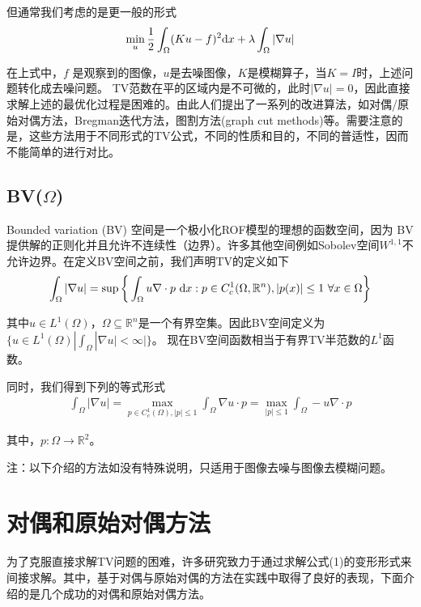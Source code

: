 \documentclass[a4paper,12pt]{article}
\begin{document}
但通常我们考虑的是更一般的形式
\begin{eqnarray}
\min_u \frac{1}{2}\int_{\Omega}(Ku-f)^2\mathrm{d} x+\lambda\int_{\Omega}|\nabla u| 
\end{eqnarray}

在上式中，$f$ 是观察到的图像，$u$是去噪图像，$K$是模糊算子，当$K=I$时，上述问题转化成去噪问题。
TV范数在平的区域内是不可微的，此时$|\nabla u|=0$，因此直接求解上述的最优化过程是困难的。由此人们提出了一系列的改进算法，如对偶/原始对偶方法，Bregman迭代方法，图割方法(graph cut methods)等。需要注意的是，这些方法用于不同形式的TV公式，不同的性质和目的，不同的普适性，因而不能简单的进行对比。

\subsection{BV($\Omega$)}

Bounded variation (BV) 空间是一个极小化ROF模型的理想的函数空间，因为
BV提供解的正则化并且允许不连续性（边界）。许多其他空间例如Sobolev空间$W^{1,1}$不允许边界。在定义BV空间之前，我们声明TV的定义如下
\begin{eqnarray*}
\int_{\Omega}|\nabla u|=\sup\bigg{\{}\int_{\Omega}u\nabla\cdot p\ \mathrm{d} x:p\in C_c^1(\Omega, \mathbb{R}^n),|p(x)|\leq 1\ \forall x\in \Omega\bigg{\}}
\end{eqnarray*}

其中$u\in L^1(\Omega)$，$\Omega\subseteq\mathbb{R}^n$是一个有界空集。因此BV空间定义为$\{u\in L^1(\Omega)|\int_{\Omega}|\nabla u|<\infty|\}$。
现在BV空间函数相当于有界TV半范数的$L^1$函数。

同时，我们得到下列的等式形式
\begin{eqnarray}
\int_{\Omega}|\nabla u| =\max_{p\in C_c^1(\Omega),|p|\leq 1}\int_{\Omega}\nabla u\cdot p=\max_{|p|\leq 1}\int_{\Omega}-u\nabla\cdot p
\end{eqnarray}

其中，$p:\Omega\rightarrow \mathbb{R}^2$。

注：以下介绍的方法如没有特殊说明，只适用于图像去噪与图像去模糊问题。
\section{对偶和原始对偶方法}
为了克服直接求解TV问题的困难，许多研究致力于通过求解公式(1)的变形形式来间接求解。其中，基于对偶与原始对偶的方法在实践中取得了良好的表现，下面介绍的是几个成功的对偶和原始对偶方法。
\end{document}
